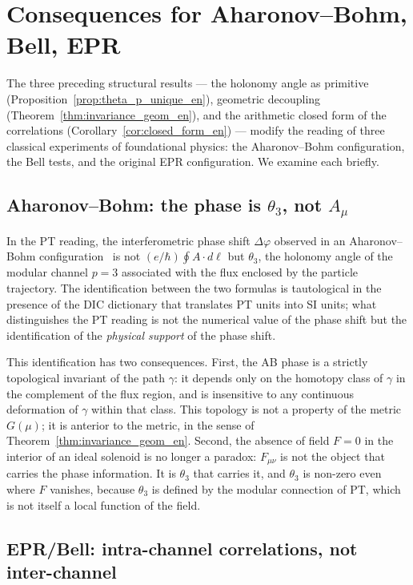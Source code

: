\section{Consequences for Aharonov--Bohm, Bell, EPR}
\label{sec:consequences_bell_ab_epr_en}

The three preceding structural results --- the holonomy angle as
primitive (Proposition~\ref{prop:theta_p_unique_en}), geometric
decoupling (Theorem~\ref{thm:invariance_geom_en}), and the
arithmetic closed form of the correlations
(Corollary~\ref{cor:closed_form_en}) --- modify the reading of
three classical experiments of foundational physics: the
Aharonov--Bohm configuration, the Bell tests, and the original
EPR configuration. We examine each briefly.

\subsection{Aharonov--Bohm: the phase is $\theta_3$, not $A_\mu$}
\label{ssec:ab_consequence_en}

In the PT reading, the interferometric phase shift
$\Delta\varphi$ observed in an Aharonov--Bohm
configuration~\cite{AharonovBohm1959} is not
$(e/\hbar) \oint A \cdot d\ell$ but $\theta_3$, the holonomy
angle of the modular channel $p = 3$ associated with the flux
enclosed by the particle trajectory. The identification between
the two formulas is tautological in the presence of the DIC
dictionary that translates PT units into SI units; what
distinguishes the PT reading is not the numerical value of the
phase shift but the identification of the \emph{physical support}
of the phase shift.

This identification has two consequences. First, the AB phase
is a strictly topological invariant of the path $\gamma$: it
depends only on the homotopy class of $\gamma$ in the complement
of the flux region, and is insensitive to any continuous
deformation of $\gamma$ within that class. This topology is not
a property of the metric $G(\mu)$; it is anterior to the metric,
in the sense of Theorem~\ref{thm:invariance_geom_en}. Second,
the absence of field $F = 0$ in the interior of an ideal solenoid
is no longer a paradox: $F_{\mu\nu}$ is not the object that
carries the phase information. It is $\theta_3$ that carries it,
and $\theta_3$ is non-zero even where $F$ vanishes, because
$\theta_3$ is defined by the modular connection of PT, which is
not itself a local function of the field.

\subsection{EPR/Bell: intra-channel correlations, not inter-channel}
\label{ssec:bell_consequence_en}

